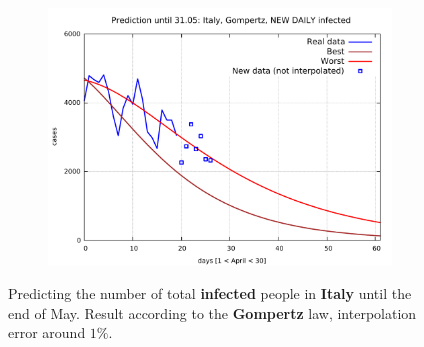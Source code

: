\documentclass[8pt]{article}
\begin{document}
\begin{figure}[h!]
\begin{subfigure}[b]{0.48\linewidth}
  \includegraphics[width=\linewidth]{../it_g_t/peak/peak_prediction.pdf}
  \end{subfigure}
  \caption{Predicting the number of total \textbf{infected}
	people in \textbf{Italy} until the
	end of May. Result according to the \textbf{Gompertz} law,
	interpolation error around $1\%$.}
\end{figure}
\end{document}
